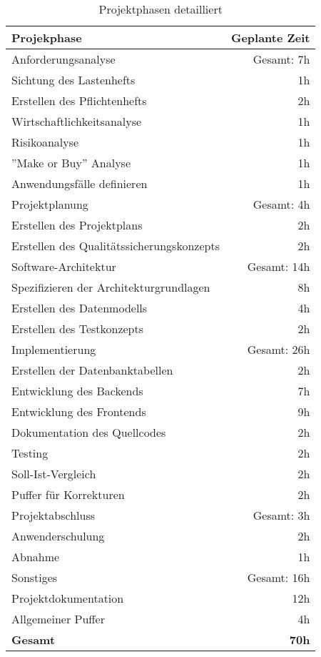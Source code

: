 \label{app:projektphasen_detail}
\begin{table}[H]
	\centering
	\begin{tabular}{lr}

		\rowcolor{white!15}				
		\textbf{Projekphase} & \textbf{Geplante Zeit} \\\hline

		\rowcolor{MidnightBlue!25}
	    Anforderungsanalyse & Gesamt: 7h \\\hline
	    Sichtung des Lastenhefts & 1h \\	    
	    Erstellen des Pflichtenhefts & 2h \\	    
	    Wirtschaftlichkeitsanalyse & 1h \\	     
	    Risikoanalyse & 1h \\	      
	    ''Make or Buy'' Analyse & 1h \\	    
		Anwendungsfälle definieren & 1h \\

	    \rowcolor{MidnightBlue!25}
	    Projektplanung & Gesamt: 4h \\\hline
	    Erstellen des Projektplans & 2h \\
		Erstellen des Qualitätssicherungskonzepts & 2h \\
		
		\rowcolor{MidnightBlue!25}
	    Software-Architektur & Gesamt: 14h \\\hline
	    Spezifizieren der Architekturgrundlagen & 8h \\
		Erstellen des Datenmodells & 4h \\
		Erstellen des Testkonzepts & 2h \\
		
		\rowcolor{MidnightBlue!25}
	    Implementierung & Gesamt: 26h \\\hline
	    Erstellen der Datenbanktabellen & 2h \\
		Entwicklung des Backends & 7h \\
		Entwicklung des Frontends & 9h \\
		Dokumentation des Quellcodes & 2h \\
	    Testing & 2h \\
		Soll-Ist-Vergleich & 2h \\
		Puffer für Korrekturen & 2h \\
		
		\rowcolor{MidnightBlue!25}
	    Projektabschluss & Gesamt: 3h \\\hline
	    Anwenderschulung & 2h \\
		Abnahme & 1h \\
		
		\rowcolor{MidnightBlue!25}
	    Sonstiges & Gesamt: 16h \\\hline
	    Projektdokumentation & 12h \\
		Allgemeiner Puffer & 4h \\\hline
		
		\textbf{Gesamt} & \textbf{70h}				
			    
	\end{tabular}
	\caption{Projektphasen detailliert}
	\label{tab:projektphasen_detail}
	\end{table}